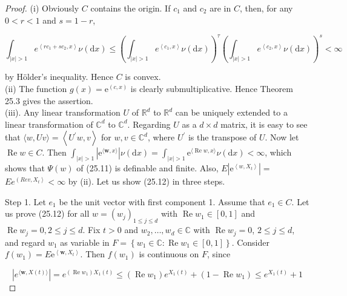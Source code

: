 \documentclass[a4paper,11pt]{article}
\begin{document}
\begin{proof}
    (i) Obviously $C$ contains the origin. If $c_{1}$ and $c_{2}$ are in $C$, then, for any $0<r<1$ and $s=1-r$,

    $$
        \int_{|x|>1} e^{\left\langle r c_{1}+s c_{2}, x\right\rangle} \nu(\mathrm{d} x) \leq\left(\int_{|x|>1} e^{\left\langle c_{1}, x\right\rangle } \nu(\mathrm{d} x)\right)^{\tau}\left(\int_{|x|>1} e^{\left\langle c_{2}, x\right\rangle} \nu(\mathrm{d} x)\right)^{s}<\infty
    $$

    by Hölder's inequality. Hence $C$ is convex.\\

    (ii) The function $g(x)=\mathrm{e}^{(c, x)}$ is clearly submultiplicative. Hence Theorem 25.3 gives the assertion. \\

    (iii). Any linear transformation $U$ of $\mathbb{R}^{d}$ to $\mathbb{R}^{d}$ can be uniquely extended to a linear transformation of $\mathbb{C}^{d}$ to $\mathbb{C}^{d}$. Regarding $U$ as a $d \times d$ matrix, it is easy to see that $\langle w, U v\rangle=\left\langle U^{\prime} w, v\right\rangle$ for $w, v \in \mathbb{C}^{d}$, where $U^{\prime}$ is the transpose of $U$. Now let $\operatorname{Re} w \in C$. Then $\int_{|x|>1}\left|\mathrm{e}^{\langle\boldsymbol{w}, x\rangle}\right| \nu(\mathrm{d} x)=\int_{|x|>1} \mathrm{e}^{\langle\operatorname{Re} w, x\rangle} \nu(\mathrm{d} x)<\infty$, which shows that $\Psi(w)$ of (25.11) is definable and finite. Also, $E\left|\mathrm{e}^{\left\langle w, X_{t}\right\rangle}\right|=$ $E e^{\left(R e v, X_{t}\right\rangle}<\infty$ by (ii). Let us show (25.12) in three steps.

    Step 1. Let $e_{1}$ be the unit vector with first component 1. Assume that $e_{1} \in C$. Let us prove (25.12) for all $w=\left(w_{j}\right)_{1 \leq j \leq d}$ with $\operatorname{Re} w_{1} \in[0,1]$ and\\
    $\operatorname{Re} w_{j}=0,2 \leq j \leq d$. Fix $t>0$ and $w_{2}, \ldots, w_{d} \in \mathbb{C}$ with $\operatorname{Re} w_{j}=0$, $2 \leq j \leq d$, and regard $w_{1}$ as variable in $F=\left\{w_{1} \in \mathbb{C}: \operatorname{Re} w_{1} \in[0,1]\right\}$. Consider $f\left(w_{1}\right)=E \mathrm{e}^{\left\langle\boldsymbol{w}, X_{t}\right\rangle}$.
    Then $f\left(w_{1}\right)$ is continuous on $F$, since

    $$
        \left|e^{\langle\boldsymbol{w}, X(t)\rangle}\right|=e^{\left(\operatorname{Re} w_{1}\right) X_{1}(t)} \leq\left(\operatorname{Re} w_{1}\right) e^{X_{1}(t)}+\left(1-\operatorname{Re} w_{1}\right) \leq e^{X_{1}(t)}+1
    $$


\end{proof}
\end{document}
